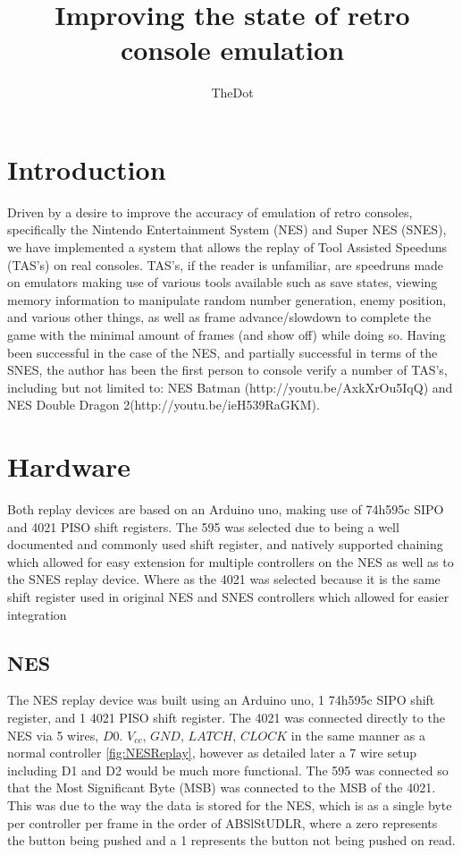 \documentclass{article}
\title{Improving the state of retro console emulation}
\author{
  TheDot \\
}
\begin{document}
\maketitle

\begin{abstract}
\lipsum[1]
\end{abstract}




\section{Introduction}
Driven by a desire to improve the accuracy of emulation of  retro consoles, specifically the Nintendo Entertainment System (NES) and Super NES (SNES), we have implemented a system that allows the replay of Tool Assisted Speeduns (TAS’s) on real consoles.  TAS’s, if the reader is unfamiliar, are speedruns made on emulators making use of various tools available such as save states, viewing memory information to manipulate random number generation, enemy position, and various other things, as well as frame advance/slowdown to complete the game with the minimal amount of frames (and show off) while doing so.  Having been successful in the case of the NES, and partially successful in terms of the SNES, the author has been the first person to console verify a number of TAS’s, including but not limited to: NES Batman (http://youtu.be/AxkXrOu5IqQ) and NES Double Dragon 2(http://youtu.be/ieH539RaGKM).  


\section{Hardware}

Both replay devices are based on an Arduino uno, making use of 74h595c SIPO and 4021 PISO shift registers.  The 595 was selected due to being a well documented and commonly used shift register, and natively supported chaining which allowed for easy extension for multiple controllers on the NES as well as to the SNES replay device. Where as the 4021 was selected because it is the same shift register used in original NES and SNES controllers which allowed for easier integration

\subsection{NES}
The NES replay device was built using an Arduino uno, 1 74h595c SIPO shift register, and 1 4021 PISO shift register.   The 4021 was connected directly to the NES via 5 wires, $D0$. $V_{cc}$, $GND$, $LATCH$, $CLOCK$ in the same manner as a normal controller \ref{fig:NESReplay}, however as detailed later a 7 wire setup including D1 and D2 would be much more functional.  The 595 was connected so that the Most Significant Byte (MSB) was connected to the MSB of the 4021.  This was due to the way the data is stored for the NES, which is as a single byte per controller per frame in the order of ABSlStUDLR, where a zero represents the button being pushed and a 1 represents the button not being pushed on read. 
\end{document}
